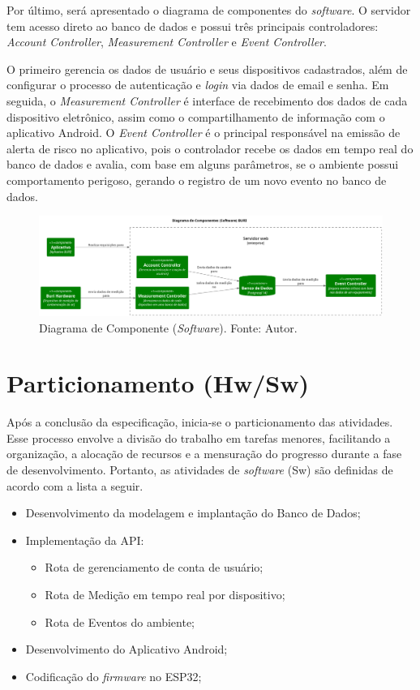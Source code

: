 Por último, será apresentado o diagrama de componentes do \textit{software}. O servidor tem acesso direto ao banco de dados e possui três principais controladores: \textit{Account Controller}, \textit{Measurement Controller} e \textit{Event Controller}. 

O primeiro gerencia os dados de usuário e seus dispositivos cadastrados, além de configurar o processo de autenticação e \textit{login} via dados de email e senha. Em seguida, o \textit{Measurement Controller} é interface de recebimento dos dados de cada dispositivo eletrônico, assim como 
o compartilhamento de informação com o aplicativo Android. O \textit{Event Controller} é o principal responsável na emissão de alerta de risco no aplicativo, pois o controlador recebe os dados em tempo real do banco de dados e avalia, 
com base em alguns parâmetros, se o ambiente possui comportamento perigoso, gerando o registro de um novo evento no banco de dados.

\begin{figure}[ht]
    \centering
    \includegraphics[width=.94\textwidth]{img/component-diagram-software.png}
    \caption{Diagrama de Componente (\textit{Software}). Fonte: Autor.}\label{figComponentSoftware}
\end{figure}

\section{Particionamento (Hw/Sw)}\label{fase3}

Após a conclusão da especificação, inicia-se o particionamento das atividades. Esse processo envolve a divisão do trabalho em tarefas menores, facilitando 
a organização, a alocação de recursos e a mensuração do progresso durante a fase de desenvolvimento. Portanto, as atividades de \textit{software} (Sw) são definidas de acordo 
com a lista a seguir.

\begin{itemize}
    \item Desenvolvimento da modelagem e implantação do Banco de Dados;
    \item Implementação da API:
    \begin{itemize}
        \item Rota de gerenciamento de conta de usuário;
        \item Rota de Medição em tempo real por dispositivo;
        \item Rota de Eventos do ambiente;
    \end{itemize}
    \item Desenvolvimento do Aplicativo Android;
    \item Codificação do \textit{firmware} no ESP32;
\end{itemize}

